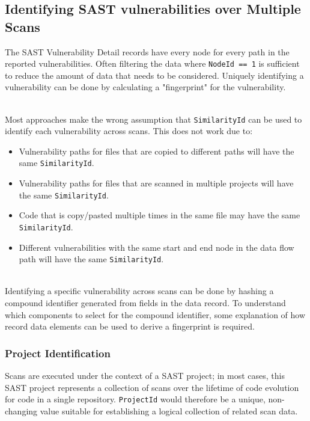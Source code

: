 \subsection{Identifying SAST vulnerabilities over Multiple Scans}

The SAST Vulnerability Detail records have every node for every path in the reported vulnerabilities.  Often filtering the data where \texttt{NodeId == 1}
is sufficient to reduce the amount of data that needs to be considered.  Uniquely identifying a vulnerability can be done by calculating a
"fingerprint" for the vulnerability.

\noindent\\Most approaches make the wrong assumption that \texttt{SimilarityId} can be used to identify each vulnerability across scans.  This does not work due to:

\begin{itemize}
    \item Vulnerability paths for files that are copied to different paths will have the same \texttt{SimilarityId}.
    \item Vulnerability paths for files that are scanned in multiple projects will have the same \texttt{SimilarityId}.
    \item Code that is copy/pasted multiple times in the same file may have the same \texttt{SimilarityId}.
    \item Different vulnerabilities with the same start and end node in the data flow path will have the same \texttt{SimilarityId}.
\end{itemize}


\noindent\\Identifying a specific vulnerability across scans can be done by hashing a compound identifier generated from fields in the data record. To understand 
which components to select for the compound identifier, some explanation of how record data elements can be used to derive a fingerprint is required.

\subsubsection{Project Identification}

Scans are executed under the context of a SAST project; in most cases, this SAST project represents a collection of scans over the lifetime of code evolution
for code in a single repository. \texttt{ProjectId} would therefore be a unique, non-changing value suitable for establishing a logical collection
of related scan data.


